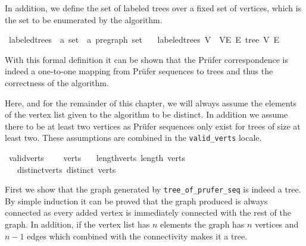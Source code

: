 In addition, we define the set of labeled trees over a fixed set of vertices, which is the set to be enumerated by the algorithm.

\begin{isabellebox}
    \isamarkupfalse%
    \ labeled{\isacharunderscore}{\kern0pt}trees\ {\isacharcolon}{\kern0pt}{\isacharcolon}{\kern0pt}\ {\isachardoublequoteopen}{\isacharprime}{\kern0pt}a\ set\ {\isasymRightarrow}\ {\isacharprime}{\kern0pt}a\ pregraph\ set{\isachardoublequoteclose}\ \isanewline
    \ \ {\isachardoublequoteopen}labeled{\isacharunderscore}{\kern0pt}trees\ V\ {\isacharequal}{\kern0pt}\ {\isacharbraceleft}{\kern0pt}{\isacharparenleft}{\kern0pt}V{\isacharcomma}{\kern0pt}E{\isacharparenright}{\kern0pt}{\isacharbar}{\kern0pt}\ E{\isachardot}{\kern0pt}\ tree\ V\ E{\isacharbraceright}{\kern0pt}{\isachardoublequoteclose}%
\end{isabellebox}

With this formal definition it can be shown that the Prüfer correspondence is indeed a one-to-one mapping from Prüfer sequences to trees and thus the correctness of the algorithm.

Here, and for the remainder of this chapter, we will always assume the elements of the vertex list given to the algorithm to be distinct.
In addition we assume there to be at least two vertices as Prüfer sequences only exist for trees of size at least two.
These assumptions are combined in the \texttt{valid\_verts} locale.

\begin{isabellebox}
    \isamarkupfalse%
    \ valid{\isacharunderscore}{\kern0pt}verts\ {\isacharequal}{\kern0pt}\isanewline
    \ \ \ verts\isanewline
    \ \ \ length{\isacharunderscore}{\kern0pt}verts{\isacharcolon}{\kern0pt}\ {\isachardoublequoteopen}length\ verts\ {\isasymge}\ {}{\isachardoublequoteclose}\isanewline
    \ \ \ distinct{\isacharunderscore}{\kern0pt}verts{\isacharcolon}{\kern0pt}\ {\isachardoublequoteopen}distinct\ verts{\isachardoublequoteclose}
\end{isabellebox}

First we show that the graph generated by \texttt{tree\_of\_prufer\_seq} is indeed a tree.
By simple induction it can be proved that the graph produced is always connected as every added vertex is immediately connected with the rest of the graph.
In addition, if the vertex list has $n$ elements the graph has $n$ vertices and $n-1$ edges which combined with the connectivity makes it a tree.

